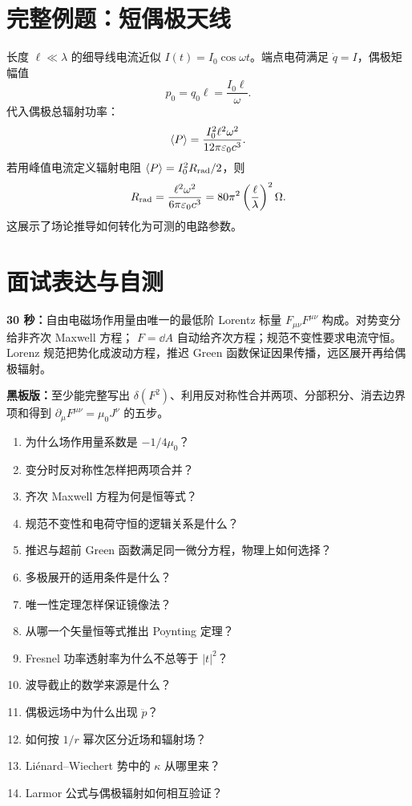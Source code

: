 \section{完整例题：短偶极天线}
长度 $\ell\ll\lambda$ 的细导线电流近似
$I(t)=I_0\cos\omega t$。端点电荷满足
$\dot q=I$，偶极矩幅值
\[
p_0=q_0\ell=\frac{I_0\ell}{\omega}.
\]
代入偶极总辐射功率：
\[
\left\langle P\right\rangle=\frac{I_0^2\ell^2\omega^2}
{12\pi\varepsilon_0c^3}.
\]
若用峰值电流定义辐射电阻
$\left\langle P\right\rangle=I_0^2R_{\rm rad}/2$，则
\[
R_{\rm rad}=\frac{\ell^2\omega^2}
{6\pi\varepsilon_0c^3}
=80\pi^2\left(\frac{\ell}{\lambda}\right)^2\Omega.
\]
这展示了场论推导如何转化为可测的电路参数。

\section{面试表达与自测}
\begin{interviewbox}
\textbf{30 秒：}自由电磁场作用量由唯一的最低阶 Lorentz 标量
$F_{\mu\nu}F^{\mu\nu}$ 构成。对势变分给非齐次 Maxwell 方程；
$F=\dd A$ 自动给齐次方程；规范不变性要求电流守恒。Lorenz 规范把势化成波动方程，推迟 Green 函数保证因果传播，远区展开再给偶极辐射。

\textbf{黑板版：}至少能完整写出
$\delta(F^2)$、利用反对称性合并两项、分部积分、消去边界项和得到
$\partial_\mu F^{\mu\nu}=\mu_0J^\nu$ 的五步。
\end{interviewbox}
\begin{selftestbox}
\begin{enumerate}
\item 为什么场作用量系数是 $-1/4\mu_0$？
\item 变分时反对称性怎样把两项合并？
\item 齐次 Maxwell 方程为何是恒等式？
\item 规范不变性和电荷守恒的逻辑关系是什么？
\item 推迟与超前 Green 函数满足同一微分方程，物理上如何选择？
\item 多极展开的适用条件是什么？
\item 唯一性定理怎样保证镜像法？
\item 从哪一个矢量恒等式推出 Poynting 定理？
\item Fresnel 功率透射率为什么不总等于 $|t|^2$？
\item 波导截止的数学来源是什么？
\item 偶极远场中为什么出现 $\ddot p$？
\item 如何按 $1/r$ 幂次区分近场和辐射场？
\item Liénard--Wiechert 势中的 $\kappa$ 从哪里来？
\item Larmor 公式与偶极辐射如何相互验证？
\end{enumerate}
\end{selftestbox}
